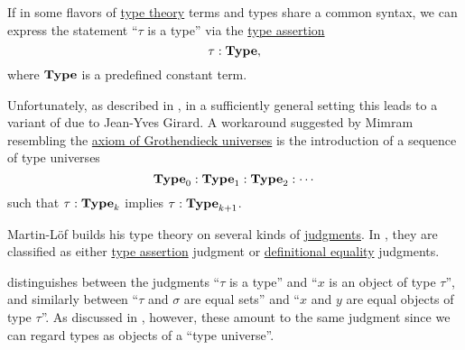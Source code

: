 \begin{remark}\label{rem:type_universes}
  If in some flavors of \hyperref[rem:type_theory]{type theory} terms and types share a common syntax, we can express the statement \enquote{\( \tau \) is a type} via the \hyperref[def:type_assertion]{type assertion}
  \begin{equation*}
    \tau: \op*{Type},
  \end{equation*}
  where \( \op*{Type} \) is a predefined constant term.

  Unfortunately, as described in , in a sufficiently general setting this leads to a variant of  due to Jean-Yves Girard. A workaround suggested by Mimram resembling the \hyperref[def:axiom_of_universes]{axiom of Grothendieck universes} is the introduction of a sequence of type universes
  \begin{equation*}
    \op*{Type}_0: \op*{Type}_1: \op*{Type}_2: \cdots
  \end{equation*}
  such that \( \tau: \op*{Type}_k \) implies \( \tau: \op*{Type}_{k+1} \).
\end{remark}

\begin{remark}\label{rem:typing_judgments}
  Martin-L\"of builds his type theory on several kinds of \hyperref[con:judgment]{judgments}. In \cite[19]{UnivalentProject2024OctoberHoTT}, they are classified as either \hyperref[def:type_assertion]{type assertion} judgment or \hyperref[con:equality]{definitional equality} judgments.

   distinguishes between the judgments \enquote{\( \tau \) is a type} and \enquote{\( x \) is an object of type \( \tau \)}, and similarly between \enquote{\( \tau \) and \( \sigma \) are equal sets} and \enquote{\( x \) and \( y \) are equal objects of type \( \tau \)}. As discussed in , however, these amount to the same judgment since we can regard types as objects of a \enquote{type universe}.
\end{remark}

